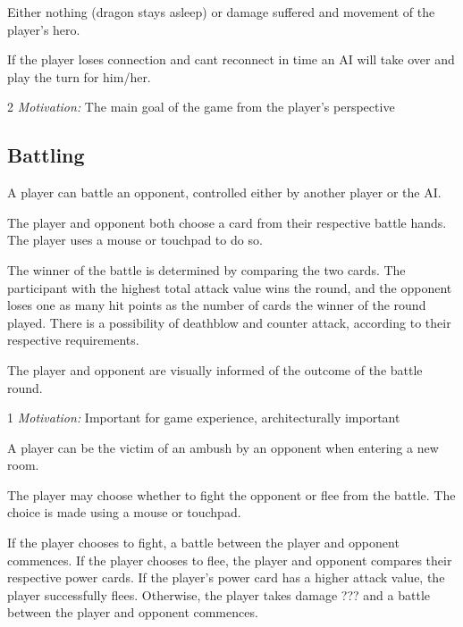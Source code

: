  Either nothing (dragon stays asleep) or damage suffered and movement of the player's hero.

 If the player loses connection and cant reconnect in time an AI will take over and play the turn for him/her. 

2 \emph{Motivation:} The main goal of the game from the player's perspective

\stoprequirement

\subsection{Battling}


A player can battle an opponent, controlled either by another player or the AI.

The player and opponent both choose a card from their respective battle hands. The player uses a mouse or touchpad to do so.

The winner of the battle is determined by comparing the two cards. The participant with the highest total attack value wins the round, and the opponent loses one as many hit points as the number of cards the winner of the round played. There is a possibility of deathblow and counter attack, according to their respective requirements.

The player and opponent are visually informed of the outcome of the battle round.

1 \emph{Motivation:} Important for game experience, architecturally important

\stoprequirement


A player can be the victim of an ambush by an opponent when entering a new room.

The player may choose whether to fight the opponent or flee from the battle. The choice is made using a mouse or touchpad.

If the player chooses to fight, a battle between the player and opponent commences. If the player chooses to flee, the player and opponent compares their respective power cards. If the player's power card has a higher attack value, the player successfully flees. Otherwise, the player takes damage ??? and a battle between the player and opponent commences.

